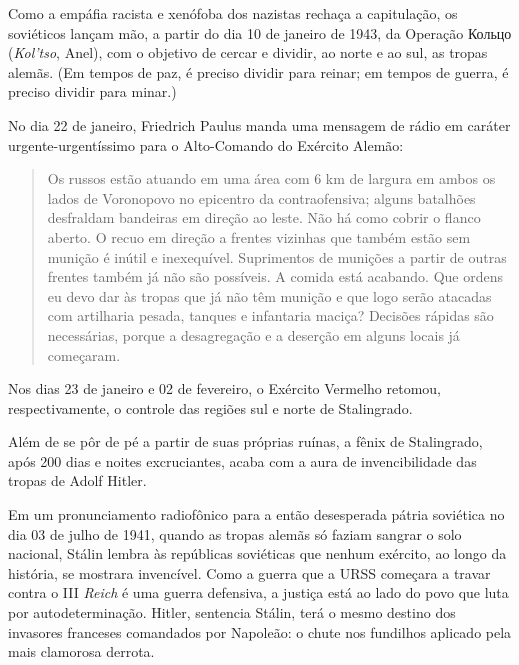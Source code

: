 Como a empáfia racista e xenófoba dos nazistas rechaça a capitulação, os
soviéticos lançam mão, a partir do dia 10 de janeiro de 1943, da
Operação Кольцо (\emph{Kol'tso}, Anel), com o objetivo de cercar e
dividir, ao norte e ao sul, as tropas alemãs. (Em tempos de paz, é
preciso dividir para reinar; em tempos de guerra, é preciso dividir para
minar.)

No dia 22 de janeiro, Friedrich Paulus manda uma mensagem de rádio em
caráter urgente-urgentíssimo para o Alto-Comando do Exército Alemão:

\begin{quote}
Os russos estão atuando em uma área com 6 km de largura em ambos os
lados de Voronopovo no epicentro da contraofensiva; alguns batalhões
desfraldam bandeiras em direção ao leste. Não há como cobrir o flanco
aberto. O recuo em direção a frentes vizinhas que também estão sem
munição é inútil e inexequível. Suprimentos de munições a partir de
outras frentes também já não são possíveis. A comida está acabando. Que
ordens eu devo dar às tropas que já não têm munição e que logo serão
atacadas com artilharia pesada, tanques e infantaria maciça? Decisões
rápidas são necessárias, porque a desagregação e a deserção em alguns
locais já começaram.
\end{quote}

Nos dias 23 de janeiro e 02 de fevereiro, o Exército Vermelho retomou,
respectivamente, o controle das regiões sul e norte de Stalingrado.

Além de se pôr de pé a partir de suas próprias ruínas, a fênix de
Stalingrado, após 200 dias e noites excruciantes, acaba com a aura de
invencibilidade das tropas de Adolf Hitler.

Em um pronunciamento radiofônico para a então desesperada pátria
soviética no dia 03 de julho de 1941, quando as tropas alemãs só faziam
sangrar o solo nacional, Stálin lembra às repúblicas soviéticas que
nenhum exército, ao longo da história, se mostrara invencível. Como a
guerra que a URSS começara a travar contra o III \emph{Reich} é uma
guerra defensiva, a justiça está ao lado do povo que luta por
autodeterminação. Hitler, sentencia Stálin, terá o mesmo destino dos
invasores franceses comandados por Napoleão: o chute nos fundilhos
aplicado pela mais clamorosa derrota.

